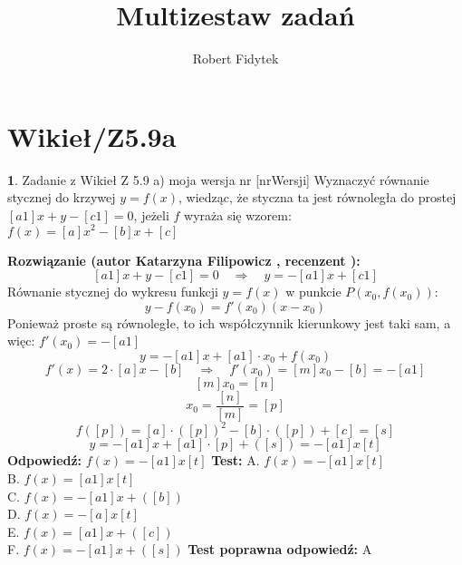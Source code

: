 \documentclass[12pt, a4paper]{article}
\title{Multizestaw zadań}
\author{Robert Fidytek}
\date{}
\theoremstyle{definition} %
\newtheorem{zad}{}
\newcommand{\kategoria}[1]{\section{#1}} %
\newcommand{\zadStart}[1]{\begin{zad}#1\newline} %
\newcommand{\zadStop}{\end{zad}}   %
\newcommand{\rozwStart}[2]{\noindent \textbf{Rozwiązanie (autor #1 , recenzent #2): }\newline} %
\newcommand{\rozwStop}{\newline}                                            %
\newcommand{\odpStart}{\noindent \textbf{Odpowiedź:}\newline}    %
\newcommand{\odpStop}{\newline}                                             %
\newcommand{\testStart}{\noindent \textbf{Test:}\newline} %
\newcommand{\testStop}{\newline} %
\newcommand{\kluczStart}{\noindent \textbf{Test poprawna odpowiedź:}\newline} %
\newcommand{\kluczStop}{\newline} %
\begin{document}
\maketitle


\kategoria{Wikieł/Z5.9a}
\zadStart{Zadanie z Wikieł Z 5.9 a) moja wersja nr [nrWersji]}
Wyznaczyć równanie stycznej do krzywej $y=f(x)$, wiedząc, że styczna ta jest równoległa do prostej $[a1]x+y-[c1]=0$, jeżeli $f$ wyraża się wzorem:\\
$f(x)=[a]x^2-[b]x+[c] $
\zadStop
\rozwStart{Katarzyna Filipowicz}{}
$$
[a1]x+y-[c1]=0 \quad \Rightarrow \quad y=-[a1]x+[c1]
$$
Równanie stycznej do wykresu funkcji $y=f(x)$ w punkcie $P(x_0,f(x_0))$:
$$
y-f(x_0)=f'(x_0)(x-x_0)
$$
Ponieważ proste są równoległe, to ich współczynnik kierunkowy jest taki sam, a więc: $f'(x_0)=-[a1]$
$$
y=-[a1]x+[a1]\cdot x_0+f(x_0)
$$ $$
f'(x)=2\cdot [a]x-[b] \quad \Rightarrow \quad f'(x_0)=[m]x_0-[b]=-[a1]
$$ $$
[m]x_0=[n]
$$ $$
x_0=\frac{[n]}{[m]}=[p]
$$ $$
f([p])=[a]\cdot([p])^2-[b]\cdot([p])+[c]=[s]
$$ $$
y=-[a1]x+[a1]\cdot[p]+([s])=-[a1]x [t]
$$
\rozwStop
\odpStart
$f(x)=-[a1]x [t]$
\odpStop
\testStart
A. $f(x)=-[a1]x [t]$\\
B. $f(x)=[a1]x [t]$\\
C. $f(x)=-[a1]x+([b])$\\
D. $f(x)=-[a]x [t]$\\
E. $f(x)=[a1]x+([c])$\\
F. $f(x)=-[a1]x+([s])$
\testStop
\kluczStart
A
\kluczStop
\end{document}
